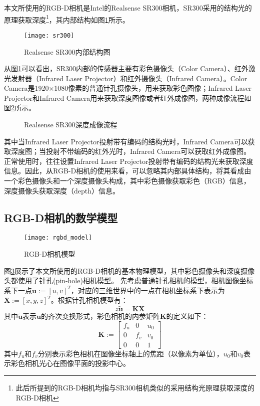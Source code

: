 本文所使用的RGB-D相机是Intel的Realsense SR300相机，SR300采用的结构光的原理获取深度\footnote{此后所提到的RGB-D相机均指与SR300相机类似的采用结构光原理获取深度的RGB-D相机}，其内部结构如图\ref{fig:sr300}所示。
\begin{figure}[!ht]
  \centering
  \texttt{[image: sr300]}
  \caption{Realsense SR300内部结构图}
  \label{fig:sr300}
\end{figure}
从图\ref{fig:sr300}可以看出，SR300内部的传感器主要有彩色摄像头（Color Camera）、红外激光发射器（Infrared Laser Projector）和红外摄像头（Infrared Camera）。Color Camera是1920×1080像素的普通针孔摄像头，用来获取彩色图像；Infrared Laser Projector和Infrared Camera用来获取深度图像或者红外成像图，两种成像流程如图\ref{fig:capture_flow}所示。
\begin{figure}[!ht]
  \centering
  \vfill
  \caption{Realsense SR300深度成像流程}
  \label{fig:capture_flow}
\end{figure}
其中当Infrared Laser Projector投射带有编码的结构光时，Infrared Camera可以获取深度图；当投射不带编码的红外光时，Infrared Camera可以获取红外成像图。正常使用时，往往设置Infrared Laser Projector投射带有编码的结构光来获取深度信息。因此，从RGB-D相机的使用来看，可以忽略其内部具体结构，将其看成由一个彩色摄像头和一个深度摄像头构成，其中彩色摄像获取彩色（RGB）信息，深度摄像头获取深度（depth）信息。

\subsection{RGB-D相机的数学模型}
\begin{figure}[!ht]
  \centering
  \texttt{[image: rgbd\_model]}
  \caption{RGB-D相机模型}
  \label{fig:rgbd_model}
\end{figure}
图\ref{fig:rgbd_model}展示了本文所使用的RGB-D相机的基本物理模型，其中彩色摄像头和深度摄像头都使用了针孔(pin-hole)相机模型\cite{Heikkila2000}。
先考虑普通针孔相机的模型，相机图像坐标系下一点$\bm{u}:=[u,v]^T$，对应的三维世界中的一点在相机坐标系下表示为$\bm{X}:=[x,y,z]^T$。根据针孔相机模型有：
\begin{equation}
  \label{eq:cam_model}
  z\bm{\tilde{u}} = \bm{K}\bm{X}
\end{equation}
其中$\bm{\tilde{u}}$表示$\bm{u}$的齐次变换形式，彩色相机的内参矩阵$\bm{K}$的定义如下：
\begin{equation}
  \bm{K} := \left[
    \begin{array}{ccc}
      f_u&0&u_0 \\
      0&f_v&v_0 \\
      0&0&1
    \end{array}
  \right]
\end{equation}
其中$f_u$和$f_v$分别表示彩色相机在图像坐标轴上的焦距（以像素为单位），$u_0$和$v_0$表示彩色相机光心在图像平面的投影中心。

